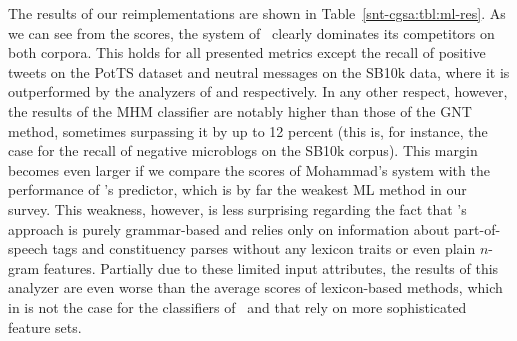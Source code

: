 The results of our reimplementations are shown in
Table~\ref{snt-cgsa:tbl:ml-res}.  As we can see from the scores, the
system of~\citet{Mohammad:13} clearly dominates its competitors on
both corpora. This holds for all presented metrics except the recall
of positive tweets on the PotTS dataset and neutral messages on the
SB10k data, where it is outperformed by the analyzers of
\citet{Guenther:14} and \citet{Gamon:04} respectively.  In any other
respect, however, the results of the MHM classifier are notably higher
than those of the GNT method, sometimes surpassing it by up to 12
percent (this is, for instance, the case for the recall of negative
microblogs on the SB10k corpus).  This margin becomes even larger if
we compare the scores of Mohammad's system with the performance of
\citeauthor{Gamon:04}'s predictor, which is by far the weakest ML
method in our survey.  This weakness, however, is less surprising
regarding the fact that \citeauthor{Gamon:04}'s approach is purely
grammar-based and relies only on information about part-of-speech tags
and constituency parses without any lexicon traits or even plain
$n$-gram features.  Partially due to these limited input attributes,
the results of this analyzer are even worse than the average scores of
lexicon-based methods, which in is not the case for the classifiers
of~\citet{Mohammad:13} and \citet{Guenther:14} that rely on more
sophisticated feature sets.




